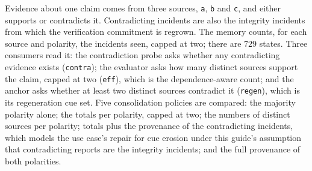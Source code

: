 \documentclass[11pt]{article}
\newcommand{\code}[1]{\texttt{#1}}
\theoremstyle{definition}
\theoremstyle{plain}
\begin{document}
Evidence about one claim comes from three sources, \code{a}, \code{b} and \code{c}, and either
supports or contradicts it. Contradicting incidents are also the integrity incidents from which the
verification commitment is regrown. The memory counts, for each source and polarity, the incidents
seen, capped at two; there are $729$ states. Three consumers read it: the contradiction probe asks
whether any contradicting evidence exists (\code{contra}); the evaluator asks how many distinct
sources support the claim, capped at two (\code{eff}), which is the dependence-aware count; and the
anchor asks whether at least two distinct sources contradict it (\code{regen}), which is its
regeneration cue set. Five consolidation policies are compared: the majority polarity alone; the
totals per polarity, capped at two; the numbers of distinct sources per polarity; totals plus the provenance of
the contradicting incidents, which models the use case's repair for cue erosion under this guide's
assumption that contradicting reports are the integrity incidents; and the full provenance of both
polarities.
\end{document}
